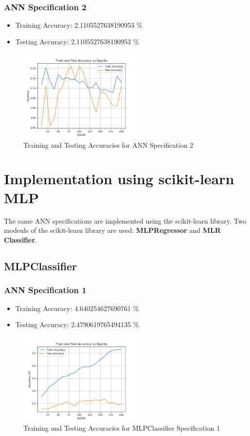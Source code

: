 \documentclass[12pt]{article}
\begin{document}
\subsubsection{ANN Specification 2}
\begin{itemize}
	\item Training Accuracy: 2.1105527638190953 \%
	\item Testing Accuracy: 2.1105527638190953 \%
\end{itemize}
\begin{figure}[H]
	\centering
	\includegraphics[width=0.55\textwidth]{Model_layer_64_32_1.png}
	\caption{Training and Testing Accuracies for ANN Specification 2}
	\label{fig:ann2}
\end{figure}

\section{Implementation using scikit-learn MLP} \label{sec:scikit-learn}
The same ANN specifications are implemented using the scikit-learn library. Two modeuls of the scikit-learn library are used: \textbf{MLPRegressor} and \textbf{MLR Classifier}.
\subsection{MLPClassifier}
\subsubsection{ANN Specification 1}
\begin{itemize}
	\item Training Accuracy: 4.640254627690761 \%
	\item Testing Accuracy: 2.4790619765494135 \%
\end{itemize}
\begin{figure}[H]
	\centering
	\includegraphics[width=0.55\textwidth]{scikit_learn_model_1_accuracy_comparison.png}
	\caption{Training and Testing Accuracies for MLPClassifier Specification 1}
	\label{fig:mlp1}
\end{figure}
\end{document}
